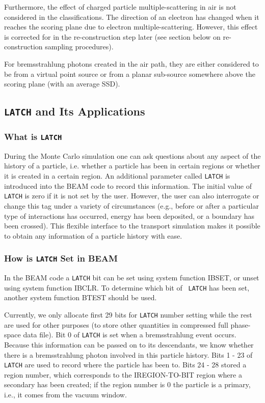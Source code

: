 \documentclass[12pt,twoside]{article}
\begin{document}
Furthermore, the effect of charged particle multiple-scattering in air is
not considered in the classifications. The direction of an electron has
changed when it reaches the scoring plane due to electron
multiple-scattering. However, this effect is corrected for in the
re-construction step later (see section below on re-construction sampling
procedures).

For bremsstrahlung photons created in the air path, they are either
considered to be from a virtual point source or from a planar sub-source
somewhere above the scoring plane (with an average SSD).

\subsection{{\tt LATCH} and Its Applications}

\subsubsection{What is {\tt LATCH}}

During the Monte Carlo simulation one can ask questions about any aspect
of the history of a particle, i.e. whether a particle has been in certain
regions or whether it is created in a certain region. An additional
parameter called {\tt LATCH} is introduced into the BEAM code to record this
information.  The initial value of {\tt LATCH} is zero if it is not set by the
user.  However, the user can also interrogate or change this tag under a
variety of circumstances (e.g., before or after a particular type of
interactions has occurred, energy has been deposited, or a boundary has
been crossed). This flexible interface to the transport simulation makes
it possible to obtain any information of a particle history with ease.

\subsubsection{How is {\tt LATCH} Set in BEAM}

In the BEAM code a {\tt LATCH} bit can be set using system function IBSET, or
unset using system function IBCLR.  To determine which bit of {\tt
LATCH} has
been set, another system function BTEST should be used.

Currently, we only allocate first 29 bits for {\tt LATCH} number setting while
the rest are used for other purposes (to store other quantities in
compressed full phase-space data file). Bit 0 of {\tt LATCH} is set when a
bremsstrahlung event occurs. Because this information can be passed on to
its descendants,  we know whether there is a bremsstrahlung photon
involved in this particle history. Bits 1 - 23 of {\tt LATCH} are used to record
where the particle has been to. Bits 24 - 28 stored a region number, which
corresponds to the IREGION-TO-BIT region where a secondary has been
created; if the region number is 0 the particle is a primary, i.e., it
comes from the vacuum window.
\end{document}
